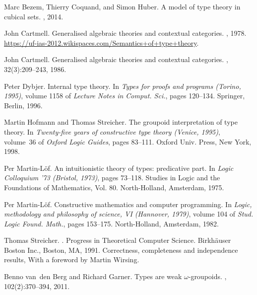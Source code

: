 \documentclass[12pt]{article}
\begin{document}
\def\cprime{$'$}
\begin{thebibliography}{10}

Marc Bezem, Thierry Coquand, and Simon Huber.
\newblock A model of type theory in cubical sets.
, 2014.

John Cartmell.
\newblock Generalised algebraic theories and contextual categories.
, 1978.
\newblock \url{https://uf-ias-2012.wikispaces.com/Semantics+of+type+theory}.

John Cartmell.
\newblock Generalised algebraic theories and contextual categories.
, 32(3):209--243, 1986.

Peter Dybjer.
\newblock Internal type theory.
\newblock In {\em Types for proofs and programs ({T}orino, 1995)}, volume 1158
  of {\em Lecture Notes in Comput. Sci.}, pages 120--134. Springer, Berlin,
  1996.

Martin Hofmann and Thomas Streicher.
\newblock The groupoid interpretation of type theory.
\newblock In {\em Twenty-five years of constructive type theory ({V}enice,
  1995)}, volume~36 of {\em Oxford Logic Guides}, pages 83--111. Oxford Univ.
  Press, New York, 1998.

Per Martin-L{\"o}f.
\newblock An intuitionistic theory of types: predicative part.
\newblock In {\em Logic {C}olloquium '73 ({B}ristol, 1973)}, pages 73--118.
  Studies in Logic and the Foundations of Mathematics, Vol. 80. North-Holland,
  Amsterdam, 1975.

Per Martin-L{\"o}f.
\newblock Constructive mathematics and computer programming.
\newblock In {\em Logic, methodology and philosophy of science, {VI}
  ({H}annover, 1979)}, volume 104 of {\em Stud. Logic Found. Math.}, pages
  153--175. North-Holland, Amsterdam, 1982.

Thomas Streicher.
.
\newblock Progress in Theoretical Computer Science. Birkh\"auser Boston Inc.,
  Boston, MA, 1991.
\newblock Correctness, completeness and independence results, With a foreword
  by Martin Wirsing.

Benno van~den Berg and Richard Garner.
\newblock Types are weak {$\omega$}-groupoids.
, 102(2):370--394, 2011.


\end{thebibliography}
\end{document}
